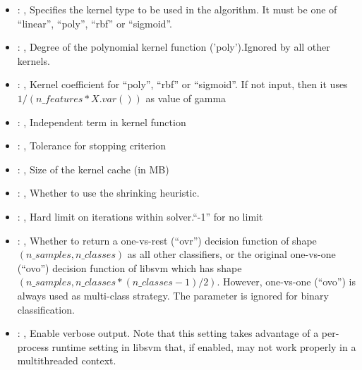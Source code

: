 \begin{itemize}
    \item {}: , 
      Specifies the kernel type to be used in the algorithm. It must be one of
      ``linear'', ``poly'', ``rbf'' or ``sigmoid''.

    \item {}: , 
      Degree of the polynomial kernel function ('poly').Ignored by all other kernels.

    \item {}: , 
      Kernel coefficient for ``poly'', ``rbf'' or ``sigmoid''. If not input, then it uses
      $1 / (n\_features * X.var())$ as value of gamma

    \item {}: , 
      Independent term in kernel function

    \item {}: , 
      Tolerance for stopping criterion

    \item {}: , 
      Size of the kernel cache (in MB)

    \item {}: , 
      Whether to use the shrinking heuristic.

    \item {}: , 
      Hard limit on iterations within solver.``-1'' for no limit

    \item {}: , 
      Whether to return a one-vs-rest (``ovr'') decision function of shape $(n\_samples, n\_classes)$
      as                                                            all other classifiers, or the
      original one-vs-one (``ovo'') decision function of libsvm which has
      shape $(n\_samples, n\_classes * (n\_classes - 1) / 2)$. However, one-vs-one (``ovo'') is always
      used as                                                            multi-class strategy. The
      parameter is ignored for binary classification.

    \item {}: , 
      Enable verbose output. Note that this setting takes advantage
      of a per-process runtime setting in libsvm that, if enabled, may not
      work properly in a multithreaded context.


\end{itemize}
